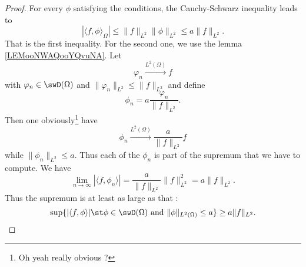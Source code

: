 \begin{proof}
    For every \( \phi\) satisfying the conditions, the Cauchy-Schwarz inequality leads to
    \begin{equation}
        | \langle f, \phi\rangle_{\Omega} |\leq \| f \|_{L^2}\| \phi \|_{L^2}\leq a\| f \|_{L^2}.
    \end{equation}
    That is the first inequality. For the second one, we use the lemma \ref{LEMooNWAQooYQvuNA}. Let 
    \begin{equation}
        \varphi_n\stackrel{L^2(\Omega)}{\longrightarrow}f
    \end{equation}
    with \( \varphi_n\in\swD(\Omega)\) and \( \| \varphi_n \|_{L^2}\leq \| f \|_{L^2}\) and define
    \begin{equation}
        \phi_n=a\frac{ \varphi_n }{ \| f \|_{L^2} }.
    \end{equation}
    Then one obviously\footnote{Oh yeah really obvious ?} have
    \begin{equation}
        \phi_n\stackrel{L^2(\Omega)}{\longrightarrow}\frac{ a }{ \| f \|_{L^2} }f
    \end{equation}
    while \( \| \phi_n \|_{L^2}\leq a\). Thus each of the \( \phi_n\) is part of the supremum that we have to compute. We have
    \begin{equation}
        \lim_{n\to \infty} | \langle f, \phi_n\rangle  |=\frac{ a }{ \| f \|_{L^2} }\| f \|^2_{L^2}=a\| f \|_{L^2}.
    \end{equation}
    Thus the supremum is at least as large as that :
    \begin{equation}
        \sup\{ | \langle f, \phi\rangle  |\st \phi\in\swD(\Omega)\text{ and }\| \phi \|_{L^2(\Omega)}\leq a \}\geq a\| f \|_{L^2}.
    \end{equation}
\end{proof}

